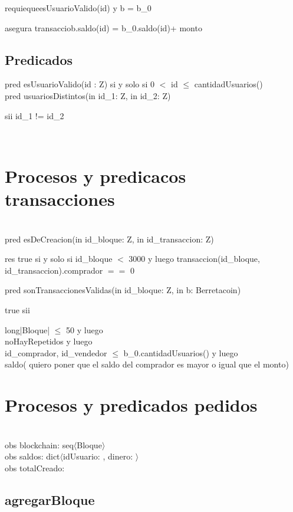\documentclass[10pt,a4paper]{article}
\begin{document}
{{    requieque{esUsuarioValido(id) y b = b_0}

    asegura{ transacciob.saldo(id) = b_0.saldo(id)+ monto}\\


\subsection{Predicados}
pred esUsuarioValido(id : Z){
    si y solo si  0 $<$ id $\leq$ cantidadUsuarios()
}\\

pred usuariosDistintos(in id_1: Z, in id_2: Z){

    sii id_1 != id_2
}\\




\section{Procesos y predicacos transacciones}


}\\
pred esDeCreacion(in id_bloque: Z, in id_transaccion: Z){

    res true si y solo si id_bloque $<$ 3000 y luego transaccion(id_bloque, id_transaccion).comprador $==$ 0

}

pred sonTransaccionesValidas(in id_bloque: Z, in b: Berretacoin){
    true sii {long|Bloque| $\leq$ 50 y luego\\
    noHayRepetidos y luego\\
    id_comprador, id_vendedor $\leq$ b_0.cantidadUsuarios() y luego\\
    saldo( quiero poner que el saldo del comprador es mayor o igual que el monto)
    
}

\section{Procesos y predicados pedidos}
\\
    obs blockchain: seq$\langle$Bloque$\rangle$ %
    \\
    obs saldos: dict$\langle$idUsuario: \ent, dinero: \ent$\rangle$%
    \\
    obs totalCreado: \ent %

\subsection{agregarBloque}

}}
\end{document}
